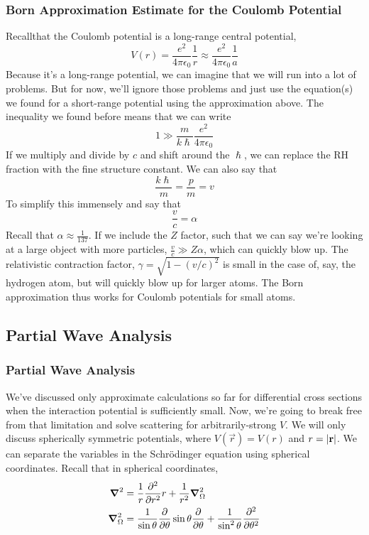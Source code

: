 \documentclass[a4paper]{article}
\begin{document}
\subsubsection{Born Approximation Estimate for the Coulomb Potential}
Recallthat the Coulomb potential is a long-range central potential,
\[
	V(r) = \frac{e^2}{4\pi\epsilon_0}\frac{1}{r}
	\approx \frac{e^2}{4\pi\epsilon_0}\frac{1}{a}
\]
Because it's a long-range potential, we can imagine that we will run into a lot
of problems. But for now, we'll ignore those problems and just use the
equation(s) we found for a short-range potential using the approximation above.
The inequality we found before means that we can write
\[
	1 \gg \frac{m}{k\hslash}\frac{e^2}{4\pi\epsilon_0}
\]
If we multiply and divide by $c$ and shift around the $\hslash$, we can replace
the RH fraction with the fine structure constant. We can also say that
\[
	\frac{k\hslash}{m} = \frac{p}{m} = v
\]
To simplify this immensely and say that
\[
	\frac{v}{c} = \alpha
\]
Recall that $\alpha \approx \frac{1}{137}$.
If we include the $Z$ factor, such that we can say we're looking at a large
object with more particles,
$\frac{v}{c} \gg Z\alpha$, which can quickly blow up. The relativistic
contraction factor, $\gamma = \sqrt{1-(v/c)^2}$ is small in the case of, say,
the hydrogen atom, but will quickly blow up for larger atoms. The Born
approximation thus works for Coulomb potentials for small atoms.

\subsection{Partial Wave Analysis}
\subsubsection{Partial Wave Analysis}
We've discussed only approximate calculations so far for differential cross
sections when the interaction potential is sufficiently small. Now, we're going
to break free from that limitation and solve scattering for arbitrarily-strong
$V$. We will only discuss spherically symmetric potentials, where
$V(\vec{r}) = V(r)$ and $r = \left\lvert \boldsymbol{\mathbf{r}}\right\rvert$. We can separate the variables in
the Schr\"odinger equation using spherical coordinates. Recall that in
spherical coordinates,
\begin{align*}
	\del^2 &= \frac{1}{r}\pd[2]{r}r + \frac{1}{r^2}\del_{\Omega}^2\\
	\del_{\Omega}^2 &= \frac{1}{\sin\theta}\pd{\theta}\sin\theta
		\pd{\theta} + \frac{1}{\sin^2\theta}\pd[2]{\theta}
\end{align*}
\end{document}
